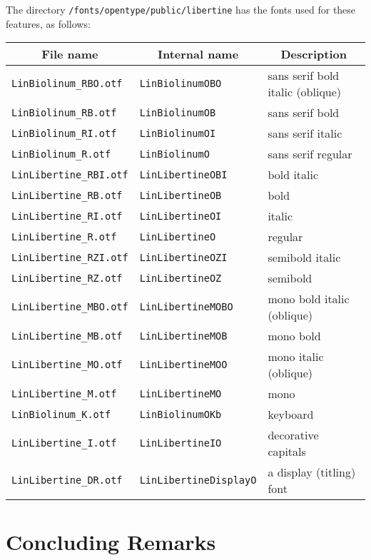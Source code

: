 \documentclass[11pt]{article}
\begin{document}
The directory
\verb|/fonts/opentype/public/libertine| 
has the fonts used for these features, as follows:
\begin{list}{}{}\item\small
\begin{tabular}{lll}
\multicolumn{1}{c}{\bf File name} & \multicolumn{1}{c}{\bf Internal name} & \multicolumn{1}{c}{\bf Description} \\
\hline
\verb|LinBiolinum_RBO.otf|  & \verb|LinBiolinumOBO|  & sans serif bold italic (oblique) \\
\verb|LinBiolinum_RB.otf|  & \verb|LinBiolinumOB| & sans serif bold \\
\verb|LinBiolinum_RI.otf|  & \verb|LinBiolinumOI| & sans serif italic \\
\verb|LinBiolinum_R.otf|  & \verb|LinBiolinumO| & sans serif regular \\
\verb|LinLibertine_RBI.otf|  & \verb|LinLibertineOBI| & bold italic \\
\verb|LinLibertine_RB.otf|  & \verb|LinLibertineOB| & bold \\
\verb|LinLibertine_RI.otf|  & \verb|LinLibertineOI| & italic \\
\verb|LinLibertine_R.otf|  & \verb|LinLibertineO| & regular \\
\verb|LinLibertine_RZI.otf|  & \verb|LinLibertineOZI| & semibold italic \\
\verb|LinLibertine_RZ.otf|  & \verb|LinLibertineOZ| & semibold \\
\verb|LinLibertine_MBO.otf| & \verb|LinLibertineMOBO| & mono bold italic (oblique) \\
\verb|LinLibertine_MB.otf| & \verb|LinLibertineMOB| & mono bold \\
\verb|LinLibertine_MO.otf| & \verb|LinLibertineMOO| & mono italic (oblique) \\
\verb|LinLibertine_M.otf| & \verb|LinLibertineMO| & mono \\
\verb|LinBiolinum_K.otf|  & \verb|LinBiolinumOKb| & keyboard \\
\verb|LinLibertine_I.otf|  & \verb|LinLibertineIO| &   decorative capitals \\
\verb|LinLibertine_DR.otf| & \verb|LinLibertineDisplayO| &   a display (titling) font  \\
\end{tabular}
\end{list}

\section{Concluding Remarks}
\end{document}
